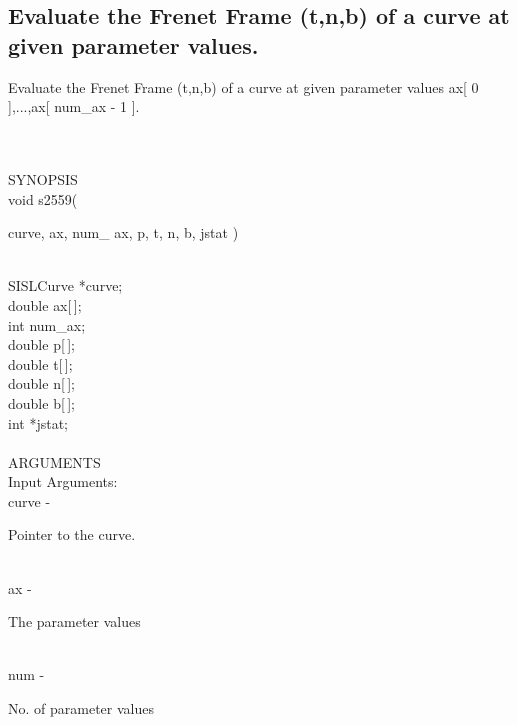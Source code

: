 \subsection{Evaluate the Frenet Frame (t,n,b) of a curve at given parameter values.}
\begin{minipg1}
Evaluate the Frenet Frame (t,n,b) of a curve
               at given parameter values ax[ 0 ],...,ax[ num\_ax - 1 ].
\end{minipg1} \\ \\
SYNOPSIS\\
        \> void s2559(\begin{minipg3}
             {\fov curve},  {\fov ax}, num\_ {\fov ax},  {\fov p},  {\fov t},  {\fov n},  {\fov b}, jstat )
                \end{minipg3}\\
                \>\>    SISLCurve    \>  *{\fov curve};\\
                \>\>    double    \>  {\fov ax}[\,];\\
                \>\>    int    \>  {\fov num}\_ax;\\
                \>\>    double    \>  {\fov p}[\,];\\
                \>\>    double    \>  {\fov t}[\,];\\
                \>\>    double    \>  {\fov n}[\,];\\
                \>\>    double    \>  {\fov b}[\,];\\
                \>\>    int    \>  *{\fov jstat};\\
\\
ARGUMENTS\\
	\>Input Arguments:\\
        \>\>    {\fov curve}\> - \>  \begin{minipg2}
                     Pointer to the curve.
                               \end{minipg2}\\
        \>\>    {\fov ax}\> - \>  \begin{minipg2}
                     The parameter values
                               \end{minipg2}\\
        \>\>    {\fov num}\> - \>  \begin{minipg2}
                     No. of parameter values
                               \end{minipg2}\\
